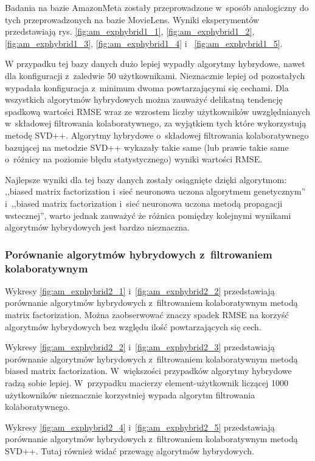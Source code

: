 \documentclass[twoside]{iisthesis}
\begin{document}
		Badania na bazie AmazonMeta zostały przeprowadzone w~sposób analogiczny do tych przeprowadzonych na bazie MovieLens. Wyniki eksperymentów przedstawiają rys. \ref{fig:am_exphybrid1_1}, \ref{fig:am_exphybrid1_2}, \ref{fig:am_exphybrid1_3}, \ref{fig:am_exphybrid1_4} i~ \ref{fig:am_exphybrid1_5}.
		
		W przypadku tej bazy danych dużo lepiej wypadły algorytmy hybrydowe, nawet dla konfiguracji z~zaledwie 50 użytkownikami. Nieznacznie lepiej od pozostałych wypadała konfiguracja z~minimum dwoma powtarzającymi się cechami. Dla wszystkich algorytmów hybrydowych można zauważyć delikatną tendencję spadkową wartości RMSE wraz ze wzrostem liczby użytkowników uwzględnianych w~składowej filtrowania kolaboratywnego, za wyjątkiem tych które wykorzystują metodę SVD++. Algorytmy hybrydowe o~składowej filtrowania kolaboratywnego bazującej na metodzie SVD++ wykazały takie same (lub prawie takie same o~różnicy na poziomie błędu statystycznego) wyniki wartości RMSE.
		
		Najlepsze wyniki dla tej bazy danych zostały osiągnięte dzięki algorytmom: ,,biased matrix factorization i~sieć neuronowa uczona algorytmem genetycznym'' i~,,biased matrix factorization i~sieć neuronowa uczona metodą propagacji wstecznej'', warto jednak zauważyć że różnica pomiędzy kolejnymi wynikami algorytmów hybrydowych jest bardzo nieznaczna. 
		

		\subsubsection{Porównanie algorytmów hybrydowych z~filtrowaniem kolaboratywnym}
		
		Wykresy \ref{fig:am_exphybrid2_1} i~\ref{fig:am_exphybrid2_2} przedstawiają porównanie algorytmów hybrydowych z~filtrowaniem kolaboratywnym metodą matrix factorization. Można zaobserwować znaczy spadek RMSE na korzyść algorytmów hybrydowych bez względu ilość powtarzających się cech.
		
		Wykresy \ref{fig:am_exphybrid2_2} i~\ref{fig:am_exphybrid2_3} przedstawiają porównanie algorytmów hybrydowych z~filtrowaniem kolaboratywnym metodą biased matrix factorization. W~większości przypadków algorytmy hybrydowe radzą sobie lepiej. W~przypadku macierzy element-użytkownik liczącej 1000 użytkowników nieznacznie korzystniej wypada algorytm filtrowania kolaboratywnego.
		
		Wykresy \ref{fig:am_exphybrid2_4} i~\ref{fig:am_exphybrid2_5} przedstawiają porównanie algorytmów hybrydowych z~filtrowaniem kolaboratywnym metodą SVD++. Tutaj również widać przewagę algorytmów hybrydowych.
			
\end{document}
